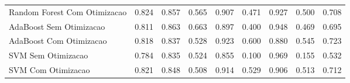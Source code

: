 \begin{table}[H]
\begin{adjustwidth}{ -1in }{ -1in }
\begin{tabular}{lrrrrrrrr}
      Random Forest Com Otimizacao &                        0.824 &                         0.857 &                            0.565 &                            0.907 &                          0.471 &                          0.927 &                                     0.500 &                                 0.708 \\
           AdaBoost Sem Otimizacao &                        0.811 &                         0.863 &                            0.663 &                            0.897 &                          0.400 &                          0.948 &                                     0.469 &                                 0.695 \\
           AdaBoost Com Otimizacao &                        0.818 &                         0.837 &                            0.528 &                            0.923 &                          0.600 &                          0.880 &                                     0.545 &                                 0.723 \\
                SVM Sem Otimizacao &                        0.784 &                         0.835 &                            0.524 &                            0.855 &                          0.100 &                          0.969 &                                     0.155 &                                 0.532 \\
                SVM Com Otimizacao &                        0.821 &                         0.848 &                            0.508 &                            0.914 &                          0.529 &                          0.906 &                                     0.513 &                                 0.712 \\
\bottomrule
\end{tabular}
    \end{adjustwidth}
    \renewcommand{\arraystretch}{1.0} %
\end{table}
